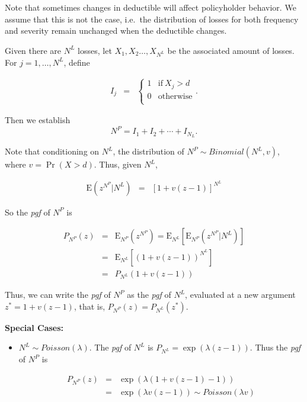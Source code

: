 \documentclass[]{book}
\providecommand{\tightlist}{%
  \setlength{\itemsep}{0pt}\setlength{\parskip}{0pt}}
\theoremstyle{definition}
\theoremstyle{definition}
\theoremstyle{definition}
\theoremstyle{remark}
\begin{document}
Note that sometimes changes in deductible will affect policyholder
behavior. We assume that this is not the case, i.e.~the distribution of
losses for both frequency and severity remain unchanged when the
deductible changes.

Given there are \(N^L\) losses, let \(X_1,X_2\ldots,X_{N^L}\) be the
associated amount of losses. For \(j=1,\ldots,N^L\), define

\begin{eqnarray*}
I_j&=&
\left \{
\begin{array}{cc}
1 & \text{if} ~X_j>d\\
0 & \text{otherwise}\\
\end{array}
\right..
\end{eqnarray*}

Then we establish \[N^P=I_1+I_2+\cdots+I_{N_L}.\]

Note that conditioning on \(N^L\), the distribution of
\(N^P \sim Binomial (N^L, v)\), where \(v=\Pr(X>d)\). Thus, given
\(N^L\),

\begin{eqnarray*}
\mathrm{E}\left(z^{N^P}|N^L\right)&=&\left[ 1+v(z-1)\right]^{N^L}
\end{eqnarray*}

So the \emph{pgf} of \(N^P\) is

\begin{eqnarray*}
P_{N^P}(z)&=&\mathrm{E}_{N^P}\left(z^{N^P}\right)=\mathrm{E}_{N^L}\left[\mathrm{E}_{N^P}\left(z^{N^P}|N^L\right)\right]\\
&=&\mathrm{E}_{N^L}\left[(1+v(z-1))^{N^L}\right]\\
&=&P_{N^L}\left(1+v(z-1)\right)
\end{eqnarray*}

Thus, we can write the \emph{pgf} of \(N^P\) as the \emph{pgf} of
\(N^L\), evaluated at a new argument \(z^* = 1+v(z-1)\), that is,
\(P_{N^P}(z)=P_{N^L}(z^*)\).

\textbf{Special Cases:}

\begin{itemize}
\tightlist
\item
  \(N^L\sim Poisson (\lambda)\). The \emph{pgf} of \(N^L\) is
  \(P_{N^L}=\exp(\lambda(z-1))\). Thus the \emph{pgf} of \(N^P\) is

  \begin{eqnarray*}
  P_{N^P}(z)&=&\exp\left( \lambda(1+v(z-1)-1)\right)\\
  &=&\exp(\lambda v(z-1))\sim Poisson (\lambda v)
  \end{eqnarray*}
\end{itemize}
\end{document}
